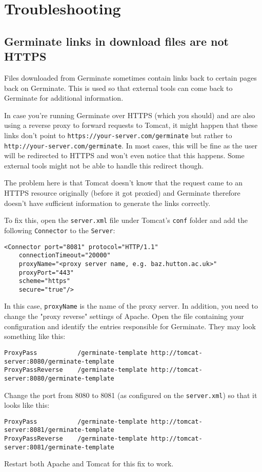 \section{Troubleshooting}
\label{sec:troubleshooting}

\subsection{Germinate links in download files are not HTTPS}
Files downloaded from Germinate sometimes contain links back to certain pages back on Germinate. This is used so that external tools can come back to Germinate for additional information.

In case you're running Germinate over HTTPS (which you should) and are also using a reverse proxy to forward requests to Tomcat, it might happen that these links don't point to \texttt{https://your-server.com/germinate} but rather to \texttt{http://your-server.com/germinate}. In most cases, this will be fine as the user will be redirected to HTTPS and won't even notice that this happens. Some external tools might not be able to handle this redirect though.

The problem here is that Tomcat doesn't know that the request came to an HTTPS resource originally (before it got proxied) and Germinate therefore doesn't have sufficient information to generate the links correctly.

To fix this, open the \texttt{server.xml} file under Tomcat's \texttt{conf} folder and add the following \texttt{Connector} to the \texttt{Server}:
\begin{lstlisting}[style=Xml]
<Connector port="8081" protocol="HTTP/1.1"
	connectionTimeout="20000"
	proxyName="<proxy server name, e.g. baz.hutton.ac.uk>"
	proxyPort="443"
	scheme="https"
	secure="true"/>
\end{lstlisting}

\noindent
In this case, \texttt{proxyName} is the name of the proxy server. In addition, you need to change the "proxy reverse" settings of Apache. Open the file containing your configuration and identify the entries responsible for Germinate. They may look something like this:

\begin{lstlisting}[style=Proxy]
ProxyPass			/germinate-template http://tomcat-server:8080/germinate-template
ProxyPassReverse	/germinate-template http://tomcat-server:8080/germinate-template
\end{lstlisting}

\noindent
Change the port from 8080 to 8081 (as configured on the \texttt{server.xml}) so that it looks like this:

\begin{lstlisting}[style=Proxy]
ProxyPass			/germinate-template http://tomcat-server:8081/germinate-template
ProxyPassReverse	/germinate-template http://tomcat-server:8081/germinate-template
\end{lstlisting}

\noindent
Restart both Apache and Tomcat for this fix to work.